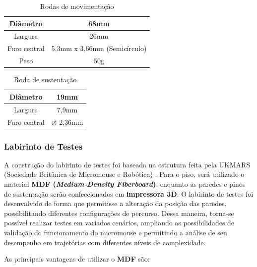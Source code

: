 \begin{table}[htbp]
    \centering
    \caption{Rodas de movimentação}
    \label{tab:placeholder}
    \begin{tabular}{|c|c|} \hline
        Diâmetro & 68mm \\ \hline
        Largura & 26mm \\ \hline
        Furo central & 5,3mm x 3,66mm (Semicírculo) \\ \hline
        Peso & 50g \\ \hline
    \end{tabular}
\end{table}

\begin{table}[htbp]
    \centering
    \caption{Roda de sustentação}
    \label{tab:placeholder}
    \begin{tabular}{|c|c|} \hline
        Diâmetro & 19mm \\ \hline
        Largura & 7,9mm \\ \hline
        Furo central & $\varnothing$ 2,36mm \\ \hline
    \end{tabular}
\end{table}

\subsubsection{Labirinto de Testes}
A construção do labirinto de testes foi baseada na estrutura feita pela UKMARS (Sociedade Britânica de Micromouse e Robótica) \cite{ukmars_maze}. Para o piso, será utilizado o material \textbf{MDF (\textit{Medium-Density Fiberboard})}, enquanto as paredes e pinos de sustentação serão confeccionados em \textbf{impressora 3D}. O labirinto de testes foi desenvolvido de forma que permitisse a alteração da posição das paredes, possibilitando diferentes configurações de percurso. Dessa maneira, torna-se possível realizar testes em variados cenários, ampliando as possibilidades de validação do funcionamento do micromouse e permitindo a análise de seu desempenho em trajetórias com diferentes níveis de complexidade.

As principais vantagens de utilizar o \textbf{MDF} são: 

